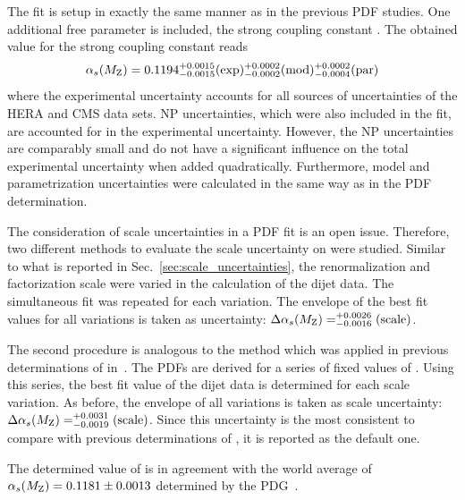 The fit is setup in exactly the same manner as
in the previous PDF studies. One additional free parameter is included, the
strong coupling constant \asmz. The obtained value for the strong coupling constant
reads
%
\begin{equation*}
  \alpha_{s}(M_\mathrm{Z}) = 0.1194_{-0.0015}^{+0.0015}(\mathrm{exp})_{-0.0002}^{+0.0002}(\mathrm{mod})_{-0.0004}^{+0.0002}(\mathrm{par})
\end{equation*}
%
where the experimental uncertainty accounts for all sources of uncertainties of
the HERA and CMS data sets. NP uncertainties, which were also included in the
fit, are accounted for in the experimental uncertainty. However, the NP
uncertainties are comparably small and do not have a significant influence on the total
experimental uncertainty when added quadratically. Furthermore, model and parametrization uncertainties
were calculated in the same way as in the PDF determination. 

The consideration of scale uncertainties in a PDF fit is an open issue.
Therefore, two different methods to evaluate the scale uncertainty on \asmz were
studied. Similar to what is reported in Sec.~\ref{sec:scale_uncertainties}, the
renormalization and factorization scale were varied in the calculation of the
dijet data. The simultaneous fit was repeated for each variation. The envelope
of the best fit \asmz values for all variations is taken as uncertainty:
$\Delta\alpha_{s}(M_\mathrm{Z})= _{-0.0016}^{+0.0026}(\mathrm{scale})$.

The second procedure is analogous to the method which was applied in previous
determinations of \asmz \eg in~\cite{CMS:2014mna,Khachatryan:2014waa}. The PDFs
are derived for a series of fixed values of \asmz. Using this series, the best
fit \asmz value of the dijet data is determined for each scale variation. As
before, the envelope of all variations is taken as scale uncertainty: $\Delta
\alpha_{s}(M_\mathrm{Z}) = _{-0.0019}^{+0.0031}(\mathrm{scale})$. Since this uncertainty is the
most consistent to compare with previous determinations of \asmz, it is reported
as the default one. 

The determined value of \asmz is in agreement with the world average of
$\alpha_{s}(M_\mathrm{Z})=0.1181\pm 0.0013$ determined by the PDG~\cite{Agashe:2014kda}.
